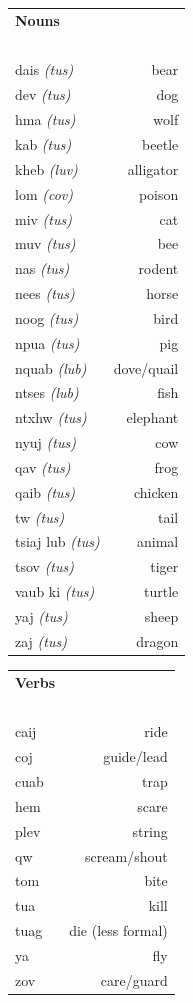 \documentclass{article}
\begin{document}
\clearpage

\begin{multicols}{2}
[
\section*{}
\begin{center}\rule{\textwidth}{.4pt}\end{center}
]

\begin{tabular}{l r}
\textbf{Nouns} \\
~\\
dais {\em (tus)} &bear\\
dev {\em (tus)} &dog\\
hma {\em (tus)} &wolf\\
kab {\em (tus)} &beetle\\
kheb {\em (luv)} &alligator\\
lom {\em (cov)} &poison\\
miv {\em (tus)} &cat\\
muv {\em (tus)} &bee\\
nas {\em (tus)} &rodent\\
nees {\em (tus)} &horse\\
noog {\em (tus)} &bird\\
npua {\em (tus)} &pig\\
nquab {\em (lub)} &dove/quail\\
ntses {\em (lub)} &fish\\
ntxhw {\em (tus)} &elephant\\
nyuj {\em (tus)} &cow\\
qav {\em (tus)} &frog\\
qaib {\em (tus)} &chicken\\
tw {\em (tus)} &tail\\
tsiaj lub {\em (tus)} &animal\\
tsov {\em (tus)} &tiger\\
vaub ki {\em (tus)} &turtle\\
yaj {\em (tus)} &sheep\\
zaj {\em (tus)} &dragon\\
\end{tabular}

\begin{tabular}{l r}
\textbf{Verbs} \\
~\\
caij &ride\\
coj &guide/lead\\
cuab &trap\\
hem &scare\\
plev &string\\
qw &scream/shout\\
tom &bite\\
tua &kill\\
tuag &die (less formal)\\
ya &fly\\
zov &care/guard\\
\end{tabular}
\end{multicols}
\end{document}
